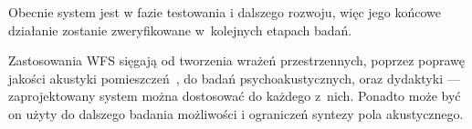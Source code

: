 \documentclass[10pt, a4paper]{article}
\begin{document}
Obecnie system jest w fazie testowania i dalszego rozwoju, więc jego końcowe
działanie zostanie zweryfikowane w~kolejnych etapach badań.

Zastosowania WFS sięgają od tworzenia wrażeń przestrzennych, poprzez poprawę
jakości akustyki pomieszczeń~\cite{enhancement}, do badań psychoakustycznych,
oraz dydaktyki --- zaprojektowany system można dostosować do każdego z~nich.
Ponadto może być on użyty do dalszego badania możliwości i ograniczeń syntezy
pola akustycznego.

\printbibliography
\end{document}
